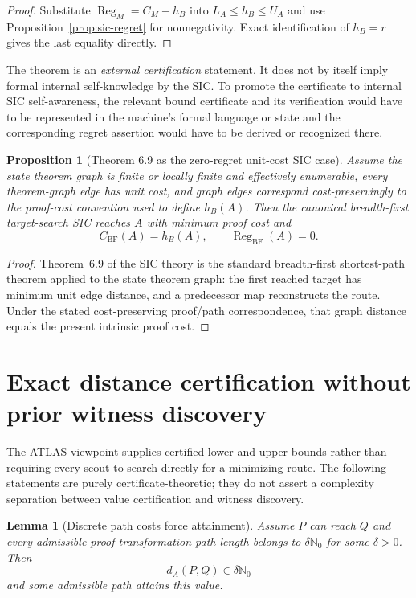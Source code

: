 \documentclass[11pt]{article}
\newtheorem{proposition}[theorem]{Proposition}
\newtheorem{lemma}[theorem]{Lemma}
\theoremstyle{definition}
\newcommand{\Reg}{\operatorname{Reg}}
\begin{document}
\begin{proof}
Substitute $\Reg_M=C_M-h_B$ into $L_A\le h_B\le U_A$ and use Proposition~\ref{prop:sic-regret} for nonnegativity.  Exact identification of $h_B=r$ gives the last equality directly.
\end{proof}

The theorem is an \emph{external certification} statement.  It does not by itself imply formal internal self-knowledge by the SIC.  To promote the certificate to internal SIC self-awareness, the relevant bound certificate and its verification would have to be represented in the machine's formal language or state and the corresponding regret assertion would have to be derived or recognized there.

\begin{proposition}[Theorem 6.9 as the zero-regret unit-cost SIC case]\label{prop:bf-zero-regret}
Assume the state theorem graph is finite or locally finite and effectively enumerable, every theorem-graph edge has unit cost, and graph edges correspond cost-preservingly to the proof-cost convention used to define $h_B(A)$.  Then the canonical breadth-first target-search SIC reaches $A$ with minimum proof cost and
\[
\boxed{C_{\mathrm{BF}}(A)=h_B(A),\qquad \Reg_{\mathrm{BF}}(A)=0.}
\]
\end{proposition}

\begin{proof}
Theorem~6.9 of the SIC theory is the standard breadth-first shortest-path theorem applied to the state theorem graph: the first reached target has minimum unit edge distance, and a predecessor map reconstructs the route.  Under the stated cost-preserving proof/path correspondence, that graph distance equals the present intrinsic proof cost.
\end{proof}

\section{Exact distance certification without prior witness discovery}

The ATLAS viewpoint supplies certified lower and upper bounds rather than requiring every scout to search directly for a minimizing route.  The following statements are purely certificate-theoretic; they do not assert a complexity separation between value certification and witness discovery.

\begin{lemma}[Discrete path costs force attainment]\label{lem:discrete-attainment}
Assume $P$ can reach $Q$ and every admissible proof-transformation path length belongs to $\delta\mathbb N_0$ for some $\delta>0$.  Then
\[
d_A(P,Q)\in\delta\mathbb N_0
\]
and some admissible path attains this value.
\end{lemma}
\end{document}
